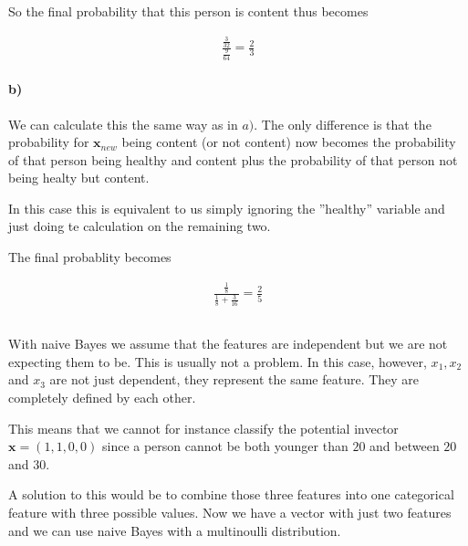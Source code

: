 \documentclass{article}
\begin{document}
So the final probability that this person is content thus becomes

\begin{align}
  \frac{\frac{3}{32}}{\frac{9}{64}} = \frac{2}{3}
\end{align}

\paragraph{b)}

We can calculate this the same way as in $a)$. The only difference is that the
probability for $\mathbf{x}_{new}$ being content (or not content) now becomes
the probability of that person being healthy and content plus the probability
of that person not being healty but content.

In this case this is equivalent to us simply ignoring the ''healthy'' variable
and just doing te calculation on the remaining two.

The final probablity becomes

\begin{align}
  \frac{\frac{1}{8}}{\frac{1}{8} + \frac{3}{16}} = \frac{2}{5}
\end{align}

\subsection{}

With naive Bayes we assume that the features are independent but we are not
expecting them to be. This is usually not a problem. In this case, however,
$x_1, x_2$ and $x_3$ are not just dependent, they represent the same feature.
They are completely defined by each other.

This means that we cannot for instance classify the potential invector
$\mathbf{x} = (1, 1, 0, 0)$ since a person cannot be both younger than $20$ and
between $20$ and $30$.

A solution to this would be to combine those three features into one
categorical feature with three possible values. Now we have a vector with just
two features and we can use naive Bayes with a multinoulli distribution.

\setcounter{section}{2}
\setcounter{subsection}{0}
\subsection{}

\subsection{}
\end{document}
